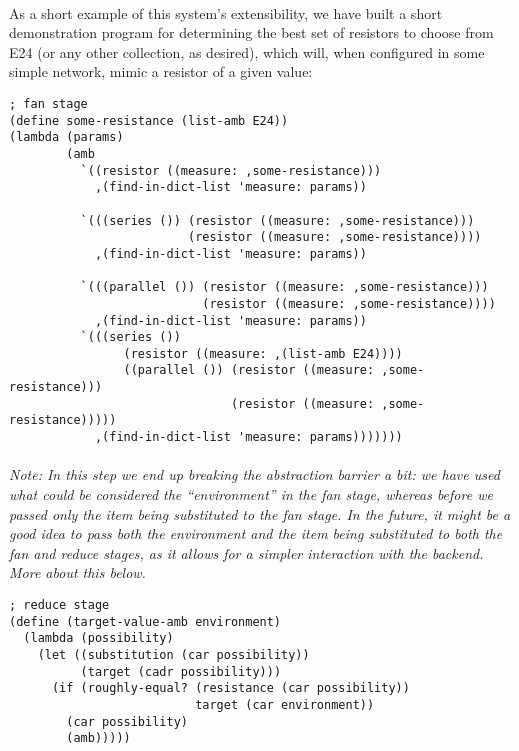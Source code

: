 \paragraph{}
As a short example of this system's extensibility, we have built a short demonstration program for determining the best set of resistors to choose from E24 (or any other collection, as desired), which will, when configured in some simple network, mimic a resistor of a given value:

\begin{verbatim}
; fan stage
(define some-resistance (list-amb E24))
(lambda (params)
        (amb
          `((resistor ((measure: ,some-resistance)))
            ,(find-in-dict-list 'measure: params))

          `(((series ()) (resistor ((measure: ,some-resistance)))
                         (resistor ((measure: ,some-resistance))))
            ,(find-in-dict-list 'measure: params))

          `(((parallel ()) (resistor ((measure: ,some-resistance)))
                           (resistor ((measure: ,some-resistance))))
            ,(find-in-dict-list 'measure: params))
          `(((series ())
                (resistor ((measure: ,(list-amb E24))))
                ((parallel ()) (resistor ((measure: ,some-resistance)))
                               (resistor ((measure: ,some-resistance)))))
            ,(find-in-dict-list 'measure: params)))))))

\end{verbatim}
\paragraph{}
\textit{Note: In this step we end up breaking the abstraction barrier a bit: we have used what could be considered the ``environment'' in the fan stage, whereas before we passed only the item being substituted to the fan stage. In the future, it might be a good idea to pass both the environment and the item being substituted to both the fan and reduce stages, as it allows for a simpler interaction with the backend. More about this below.}
\newpage
\begin{verbatim}
; reduce stage
(define (target-value-amb environment)
  (lambda (possibility)
    (let ((substitution (car possibility))
          (target (cadr possibility)))
      (if (roughly-equal? (resistance (car possibility))
                          target (car environment))
        (car possibility)
        (amb)))))
\end{verbatim}
